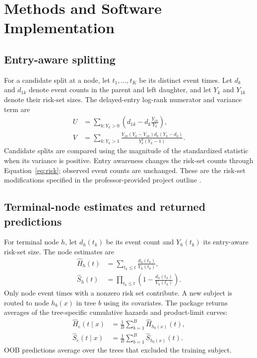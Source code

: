 \chapter{Methods and Software Implementation}
\section{Entry-aware splitting}
For a candidate split at a node, let $t_1,\ldots,t_K$ be its distinct event
times. Let $d_k$ and $d_{1k}$ denote event counts in the parent and left
daughter, and let $Y_k$ and $Y_{1k}$ denote their risk-set sizes. The
delayed-entry log-rank numerator and variance term are
\begin{align}
 U&=\sum_{k:Y_k>0}\left(d_{1k}-d_k\frac{Y_{1k}}{Y_k}\right),\\
 V&=\sum_{k:Y_k>1}
 \frac{Y_{1k}(Y_k-Y_{1k})d_k(Y_k-d_k)}{Y_k^2(Y_k-1)}.
\end{align}
Candidate splits are compared using the magnitude of the standardized
statistic when its variance is positive. Entry awareness changes the
risk-set counts through Equation~\eqref{eq:risk}; observed event counts are
unchanged. These are the risk-set modifications specified in the
professor-provided project outline \citep{projectoutline}.

\section{Terminal-node estimates and returned predictions}
For terminal node $h$, let $d_h(t_k)$ be its event count and $Y_h(t_k)$ its
entry-aware risk-set size. The node estimates are
\begin{align}
 \widehat H_h(t)&=\sum_{t_k\leq t}\frac{d_h(t_k)}{Y_h(t_k)},\\
 \widehat S_h(t)&=\prod_{t_k\leq t}
       \left(1-\frac{d_h(t_k)}{Y_h(t_k)}\right).
\end{align}
Only node event times with a nonzero risk set contribute. A new subject is
routed to node $h_b(x)$ in tree $b$ using its covariates. The package returns
averages of the tree-specific cumulative hazards and product-limit curves:
\begin{align}
 \widehat H_e(t\mid x)&=\frac{1}{B}\sum_{b=1}^{B}\widehat H_{h_b(x)}(t),\\
 \widehat S_e(t\mid x)&=\frac{1}{B}\sum_{b=1}^{B}\widehat S_{h_b(x)}(t).
\end{align}
OOB predictions average over the trees that excluded the training subject.

